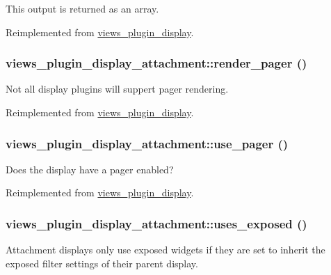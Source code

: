 This output is returned as an array. 

Reimplemented from \hyperlink{classviews__plugin__display_a7a2f2aeedfc14816815e3ce65a61aedf}{views\_\-plugin\_\-display}.\hypertarget{classviews__plugin__display__attachment_aecc79a155c6491a0c510568b07c97fb8}{
\subsubsection[{render\_\-pager}]{\setlength{\rightskip}{0pt plus 5cm}views\_\-plugin\_\-display\_\-attachment::render\_\-pager ()}}
\label{classviews__plugin__display__attachment_aecc79a155c6491a0c510568b07c97fb8}
Not all display plugins will suppert pager rendering. 

Reimplemented from \hyperlink{classviews__plugin__display_a0594f29620ea589280dee099666623c3}{views\_\-plugin\_\-display}.\hypertarget{classviews__plugin__display__attachment_a0a08a465f715c107a2dfaf9bd5dd1538}{
\subsubsection[{use\_\-pager}]{\setlength{\rightskip}{0pt plus 5cm}views\_\-plugin\_\-display\_\-attachment::use\_\-pager ()}}
\label{classviews__plugin__display__attachment_a0a08a465f715c107a2dfaf9bd5dd1538}
Does the display have a pager enabled? 

Reimplemented from \hyperlink{classviews__plugin__display_aaae358d9672426a81a1733a0236019b8}{views\_\-plugin\_\-display}.\hypertarget{classviews__plugin__display__attachment_af62963a58736c80a5750c87588fb093a}{
\subsubsection[{uses\_\-exposed}]{\setlength{\rightskip}{0pt plus 5cm}views\_\-plugin\_\-display\_\-attachment::uses\_\-exposed ()}}
\label{classviews__plugin__display__attachment_af62963a58736c80a5750c87588fb093a}
Attachment displays only use exposed widgets if they are set to inherit the exposed filter settings of their parent display. 

